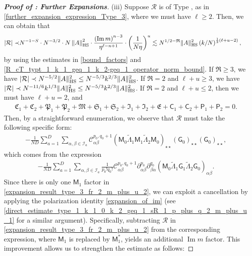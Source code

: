 \documentclass[10pt,reqno]{amsart}
\numberwithin{equation}{section}
\numberwithin{figure}{section}
\newcommand{\rmnum}[1]{\uppercase\expandafter{\romannumeral #1}}
\theoremstyle{plain} %
\theoremstyle{definition} %
\newcommand{\wt}{\widetilde}
\renewcommand{\txt}[1]{\text{\rm{#1}}}
\newcommand{\cI}{\mathcal{I}}
\newcommand{\cC}{\mathcal{C}}
\newcommand{\cR}{{\mathcal R}}
\newcommand{\fR}{\mathfrak R}
\newcommand{\fC}{\mathfrak C}
\newcommand{\fP}{\mathfrak P}
\newcommand{\fM}{\mathfrak M}
\newcommand{\fS}{\mathfrak S}
\newcommand{\fI}{\mathfrak I}
\newcommand{\fE}{\mathfrak E}
\newcommand{\sG}{\mathsf G}
\newcommand{\sM}{\mathsf M}
\newcommand{\sC}{\mathsf C}
\newcommand{\sP}{\mathsf P}
\renewcommand{\leq}{\le}
\renewcommand{\geq}{\ge}
\newcommand{\p}[1]{({#1})}
\newcommand{\pa}[1]{\left({#1}\right)}
\newcommand{\absa}[1]{\left\lvert #1 \right\rvert}
\newcommand{\norm}[1]{\lVert #1 \rVert}
\newcommand{\norma}[1]{\left\lVert #1 \right\rVert}
\DeclareMathOperator{\im}{\mathrm{Im}}
\newcommand{\tLambda}{{\wt{\Lambda}}}
\newcommand{\HS}{\txt{HS}}
\newcommand{\bsum}[3]{\sum_{#1=1}^D\sum_{#2,#3\in \cI_{#1}}}
\newcommand{\iab}{\alpha\beta}
\newcommand{\iba}{\beta\alpha}
\newcommand{\tl}{\tLambda}
\newcommand{\mm}{\ell}
\numberwithin{equation}{section}
\begin{document}
\begin{proof}[\bf Proof of : Further Expansions]
        \medskip
        \noindent(iii)  Suppose $\cR$ is of Type \rmnum{3}, as in \eqref{further_expansion_expression_Type_3}, where we must have $\mm\geq 2$. Then, we can obtain that
        \begin{align}
                \absa{\cR}\prec& N^{-1-S}\cdot N^{-3/2}\cdot N\norma{A}_{\HS}^2\cdot \frac{\pa{\im m}^{n-3}}{\eta^{\mm-n+1}}\cdot \pa{\frac{1}{N\eta}}^u\lesssim N^{1/2-\fR}\norm{A}_{\HS}^2\pa{k /N }^{\frac 13(\mm+u-2)},
            \end{align}
       by using the estimates in \eqref{bound_factors} and \eqref{R_cT_typt_1_k_1_geq_1_k_2-geq_1_operator_norm_bound}. If $\fR\geq 3$, we have $\absa{\cR}\prec N^{-5/2}\norm{A}_{\HS}^2\le N^{-5/3}k^{2/3}\norm{A}_{\HS}^2$. If $\fR=2$ and $\mm+u\geq 3$, we have $\absa{\cR}\prec N^{-11/6}k^{1/3}\norm{A}_{\HS}^2\le {N^{-5/3}k^{2/3}\norm{A}_{\HS}^2}$. If $\fR=2$ and $\mm+u\leq 2$, then we must have $\mm+u=2$, and
        \begin{equation}\nonumber
            \begin{aligned}
                \fC_1+\fC_2+\fP_1+\fP_2+\fM+\fS_1+\fS_2+\fI_1+\fI_2+\fE+\sC_1+\sC_2+\sP_1+\sP_2=0.
            \end{aligned}
        \end{equation}
       Then, by a straightforward enumeration, we observe that $\cR$ must take the following specific form:
        \begin{equation}\label{expansion_result_type_3_fr_2_m_plus_u_2}
            \begin{aligned}
                -\frac{1}{ND}\bsum{a}{\alpha}{\beta}\cC_{\iab}^{p_0,q_0+1}\p{\sM_0\tl_1\sM_1\tl_2\sM_0}_{\star\star}\p{\sG_0}_{\star\star}\p{\sG_0}_{\star\star},
            \end{aligned}
        \end{equation}
        which comes from the expression
        \begin{equation}\nonumber
            \begin{aligned}
                -\frac{1}{ND}\sum_{a=1}^D\sum_{\alpha,\beta\in \cI_a}\frac{1}{p_0!q_0!}\cC_{\iab}^{p_0,q_0+1}\partial_{\iab}^{p_0}\partial_{\iba}^{q_0}\pa{\sM_0\tl_1\sG_1\tl_2\sG_0}_{\iab}.
            \end{aligned}
        \end{equation}
        Since there is only one $\sM_1$ factor in \eqref{expansion_result_type_3_fr_2_m_plus_u_2}, we can exploit a cancellation by applying the polarization identity \eqref{expansion_of_im} (see \eqref{direct_estimate_type_1_k_1_0_k_2_geq_1_sR_1_p_plus_q_2_m_plus_u_1} for a similar argument).  Specifically, subtracting $\cR$ in \eqref{expansion_result_type_3_fr_2_m_plus_u_2} from the corresponding expression, where $\sM_1$ is replaced by $\sM_1^*$, yields an additional $\im m$ factor. This improvement allows us to strengthen the estimate as follows:

\end{proof}
\end{document}
